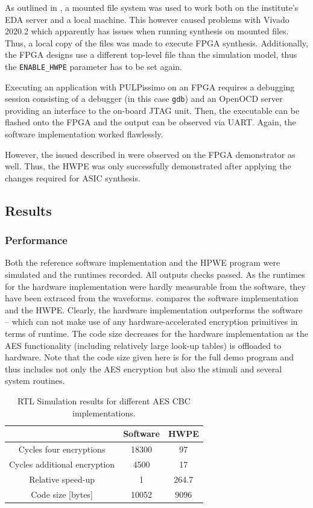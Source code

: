 \documentclass[a4paper, 12pt]{article}
\begin{document}
As outlined in , a mounted file system was used to work both on the institute's EDA server and a local machine. This however caused problems with Vivado 2020.2 which apparently has issues when running synthesis on mounted files. Thus, a local copy of the files was made to execute FPGA synthesis. Additionally, the FPGA designs use a different top-level file than the simulation model, thus the \verb|ENABLE_HWPE| parameter has to be set again.

Executing an application with PULPissimo on an FPGA requires a debugging session consisting of a debugger (in this case \texttt{gdb}) and an OpenOCD server providing an interface to the on-board JTAG unit. Then, the executable can be flashed onto the FPGA and the output can be observed via UART. Again, the software implementation worked flawlessly. 

However, the issued described in  were observed on the FPGA demonstrator as well. Thus, the HWPE was only successfully demonstrated after applying the changes required for ASIC synthesis.

\subsection{Results} \label{sec:improvements:results}

\subsubsection{Performance}

Both the reference software implementation and the HPWE program were simulated and the runtimes recorded. All outputs checks passed. As the runtimes for the hardware implementation were hardly measurable from the software, they have been extraced from the waveforms.  compares the software implementation and the HWPE. Clearly, the hardware implementation outperforms the software -- which can not make use of any hardware-accelerated encryption primitives in terms of runtime. The code size decreases for the hardware implementation as the AES functionality (including relatively large look-up tables) is offloaded to hardware. Note that the code size given here is for the full demo program and thus includes not only the AES encryption but also the stimuli and several system routines.

\begin{table}[h]
    \centering
    \begin{tabular}{c|c c}
        \toprule
        & Software & HWPE \\
        \midrule
		Cycles four encryptions & 18300 & 97 \\
		Cycles additional encryption & 4500 & 17 \\
		Relative speed-up & 1  & 264.7 \\
		Code size [bytes] & 10052 & 9096 \\
        \bottomrule
    \end{tabular}
	\caption{RTL Simulation results for different AES CBC implementations.}
	\label{tab:results}
\end{table}
\end{document}
